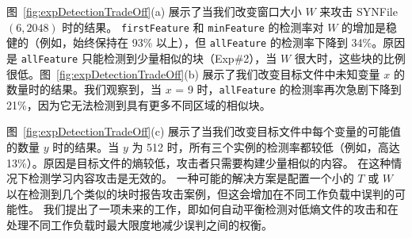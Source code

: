 图~\ref{fig:expDetectionTradeOff}(a) 展示了当我们改变窗口大小 $W$ 来攻击 SYNFile$(6, 2048)$ 时的结果。 {\tt firstFeature} 和 {\tt minFeature} 的检测率对 $W$ 的增加是稳健的（例如，始终保持在 93\% 以上），但 {\tt allFeature} 的检测率下降到 34\%。原因是 {\tt allFeature} 只能检测到少量相似的块（Exp\#2），当 $W$ 很大时，这些块的比例很低。图~\ref{fig:expDetectionTradeOff}(b) 展示了我们改变目标文件中未知变量 $x$ 的数量时的结果。我们观察到，当 $x$ = 9 时，{\tt allFeature} 的检测率再次急剧下降到 21\%，因为它无法检测到具有更多不同区域的相似块。


图~\ref{fig:expDetectionTradeOff}(c) 展示了当我们改变目标文件中每个变量的可能值的数量 $y$ 时的结果。当 $y$ 为 512 时，所有三个实例的检测率都较低（例如，高达 13\%）。原因是目标文件的熵较低，攻击者只需要构建少量相似的内容。 \sysnameF 在这种情况下检测学习内容攻击是无效的。 一种可能的解决方案是配置一个小的 $T$ 或 $W$ 以在检测到几个类似的块时报告攻击案例，但这会增加在不同工作负载中误判的可能性。 我们提出了一项未来的工作，即如何自动平衡检测对低熵文件的攻击和在处理不同工作负载时最大限度地减少误判之间的权衡。